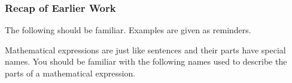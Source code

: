             \subsubsection{ Recap of Earlier Work}
            \nopagebreak
      \label{m39383*id266794}The following should be familiar. Examples are given as reminders.\par 
      \label{m39383*uid1}
            \nopagebreak
        \label{m39383*id267144}Mathematical expressions are just like sentences and their parts have special names. You should be familiar with the following names used to describe the parts of a mathematical expression.\par 
        \label{m39383*uid2}\nopagebreak\noindent{}
